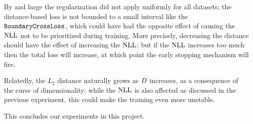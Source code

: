 \documentclass[../main.tex]{subfiles}
\begin{document}
By and large the regularization did not apply uniformly for all datasets; the distance-based loss
is not bounded to a small interval like the $\mathtt{BoundaryCrossLoss}$, which could have had the opposite
effect of causing the $\text{NLL}$ not to be prioritized during training.
More precisely, decreasing the distance should have the effect of increasing the $\text{NLL}$;
but if the $\text{NLL}$ increases too much then
the total loss will increase, at which point the early stopping mechanism will fire.

Relatedly, the $L_2$ distance naturally grows as $D$ increases, as a consequence of the curse
of dimensionality; while the $\text{NLL}$ is also affected as discussed in the previous experiment, this
could make the training even more unstable.
 
This concludes our experiments in this project.
\end{document}
